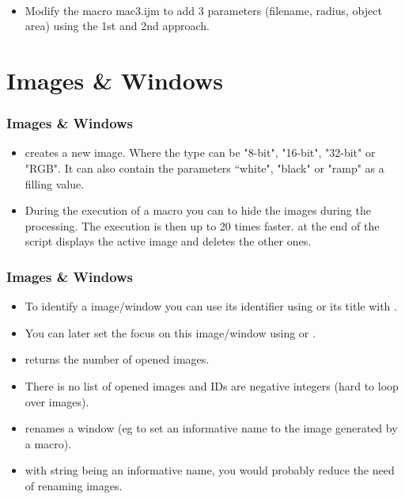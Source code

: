 \begin{frame}[fragile]
  \begin{example}~\par
    \begin{itemize}
    \item Modify the macro mac3.ijm to add 3 parameters (filename, radius,
      object area) using the 1st and 2nd approach.
    \end{itemize}
    
  \end{example}
\end{frame}

\section{Images \& Windows}
\begin{frame}
  \frametitle{Images \& Windows}
  \begin{itemize}
  \item {} creates a new
    image. Where the type can be "8-bit", "16-bit", "32-bit" or
    "RGB". It can also contain the parameters “white", "black" or
    "ramp" as a filling value.
  \item During the execution of a macro you can  to
    hide the images during the processing. The execution is then up to
    20 times faster.  at the end of the script
    displays the active image and deletes the other ones.
  \end{itemize}
\end{frame}

\begin{frame}
  \frametitle{Images \& Windows}
  \begin{itemize}
  \item To identify a image/window you can use its identifier using
     or its title with .
  \item You can later set the focus on this image/window using
     or .
  \item {} returns the number of opened images.
  \item There is no list of opened images and IDs are negative
    integers (hard to loop over images).
  \item {} renames a window (eg to set an informative name
    to the image generated by a macro).
  \item {} with string being an informative
    name, you would probably reduce the need of renaming images.
  \end{itemize}
\end{frame}


